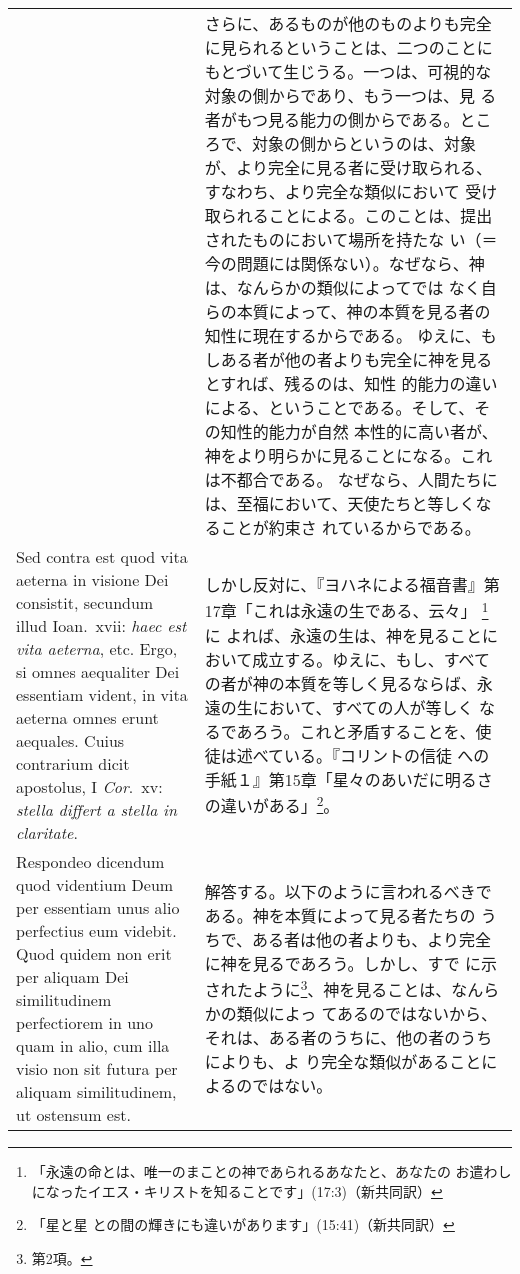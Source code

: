 \documentclass[10pt]{jsarticle} %
\begin{document}
\begin{longtable}{p{21em}p{21em}}
&

さらに、あるものが他のものよりも完全に見られるということは、二つのことに
もとづいて生じうる。一つは、可視的な対象の側からであり、もう一つは、見
る者がもつ見る能力の側からである。ところで、対象の側からというのは、対象
が、より完全に見る者に受け取られる、すなわち、より完全な類似において
受け取られることによる。このことは、提出されたものにおいて場所を持たな
い（＝今の問題には関係ない）。なぜなら、神は、なんらかの類似によってでは
なく自らの本質によって、神の本質を見る者の知性に現在するからである。
ゆえに、もしある者が他の者よりも完全に神を見るとすれば、残るのは、知性
的能力の違いによる、ということである。そして、その知性的能力が自然
本性的に高い者が、神をより明らかに見ることになる。これは不都合である。
なぜなら、人間たちには、至福において、天使たちと等しくなることが約束さ
れているからである。

\\

{\sc Sed contra est} quod vita aeterna in visione Dei consistit,
secundum illud Ioan.\ {\sc xvii}: {\it haec est vita aeterna},
etc. Ergo, si omnes aequaliter Dei essentiam vident, in vita aeterna
omnes erunt aequales. Cuius contrarium dicit apostolus, I {\it Cor}.\
{\sc xv}: {\it stella differt a stella in claritate}.

&

しかし反対に、『ヨハネによる福音書』第17章「これは永遠の生である、云々」
\footnote{「永遠の命とは、唯一のまことの神であられるあなたと、あなたの
お遣わしになったイエス・キリストを知ることです」(17:3)（新共同訳）}に
よれば、永遠の生は、神を見ることにおいて成立する。ゆえに、もし、すべて
の者が神の本質を等しく見るならば、永遠の生において、すべての人が等しく
なるであろう。これと矛盾することを、使徒は述べている。『コリントの信徒
への手紙１』第15章「星々のあいだに明るさの違いがある」\footnote{「星と星
との間の輝きにも違いがあります」(15:41)（新共同訳）}。

\\

{\sc Respondeo dicendum} quod videntium Deum per essentiam unus alio
perfectius eum videbit. Quod quidem non erit per aliquam Dei
similitudinem perfectiorem in uno quam in alio, cum illa visio non sit
futura per aliquam similitudinem, ut ostensum est. 

&

解答する。以下のように言われるべきである。神を本質によって見る者たちの
うちで、ある者は他の者よりも、より完全に神を見るであろう。しかし、すで
に示されたように\footnote{第2項。}、神を見ることは、なんらかの類似によっ
てあるのではないから、それは、ある者のうちに、他の者のうちによりも、よ
り完全な類似があることによるのではない。


\end{longtable}
\end{document}
